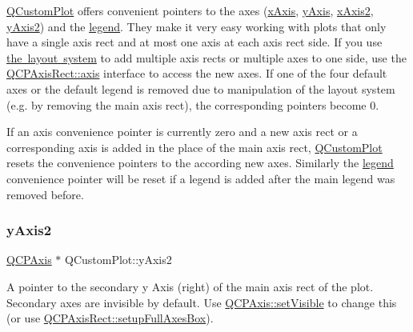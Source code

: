 \mbox{\hyperlink{class_q_custom_plot}{Q\+Custom\+Plot}} offers convenient pointers to the axes (\mbox{\hyperlink{class_q_custom_plot_a9a79cd0158a4c7f30cbc702f0fd800e4}{x\+Axis}}, \mbox{\hyperlink{class_q_custom_plot_af6fea5679725b152c14facd920b19367}{y\+Axis}}, \mbox{\hyperlink{class_q_custom_plot_ada41599f22cad901c030f3dcbdd82fd9}{x\+Axis2}}, \mbox{\hyperlink{class_q_custom_plot_af13fdc5bce7d0fabd640f13ba805c0b7}{y\+Axis2}}) and the \mbox{\hyperlink{class_q_custom_plot_a4eadcd237dc6a09938b68b16877fa6af}{legend}}. They make it very easy working with plots that only have a single axis rect and at most one axis at each axis rect side. If you use \mbox{\hyperlink{}{the layout system}} to add multiple axis rects or multiple axes to one side, use the \mbox{\hyperlink{class_q_c_p_axis_rect_a583ae4f6d78b601b732183f6cabecbe1}{Q\+C\+P\+Axis\+Rect\+::axis}} interface to access the new axes. If one of the four default axes or the default legend is removed due to manipulation of the layout system (e.\+g. by removing the main axis rect), the corresponding pointers become 0.

If an axis convenience pointer is currently zero and a new axis rect or a corresponding axis is added in the place of the main axis rect, \mbox{\hyperlink{class_q_custom_plot}{Q\+Custom\+Plot}} resets the convenience pointers to the according new axes. Similarly the \mbox{\hyperlink{class_q_custom_plot_a4eadcd237dc6a09938b68b16877fa6af}{legend}} convenience pointer will be reset if a legend is added after the main legend was removed before. \mbox{\label{class_q_custom_plot_af13fdc5bce7d0fabd640f13ba805c0b7}} 
\subsubsection{\texorpdfstring{y\+Axis2}{yAxis2}}
{\footnotesize\ttfamily \mbox{\hyperlink{class_q_c_p_axis}{Q\+C\+P\+Axis}} $\ast$ Q\+Custom\+Plot\+::y\+Axis2}

A pointer to the secondary y Axis (right) of the main axis rect of the plot. Secondary axes are invisible by default. Use \mbox{\hyperlink{class_q_c_p_layerable_a3bed99ddc396b48ce3ebfdc0418744f8}{Q\+C\+P\+Axis\+::set\+Visible}} to change this (or use \mbox{\hyperlink{class_q_c_p_axis_rect_a5fa906175447b14206954f77fc7f1ef4}{Q\+C\+P\+Axis\+Rect\+::setup\+Full\+Axes\+Box}}).

